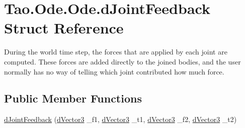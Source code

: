 \hypertarget{struct_tao_1_1_ode_1_1_ode_1_1d_joint_feedback}{
\section{Tao.Ode.Ode.dJointFeedback Struct Reference}
\label{struct_tao_1_1_ode_1_1_ode_1_1d_joint_feedback}
}


During the world time step, the forces that are applied by each joint are computed. These forces are added directly to the joined bodies, and the user normally has no way of telling which joint contributed how much force.  


\subsection*{Public Member Functions}
\begin{DoxyCompactItemize}
\item 
\hyperlink{struct_tao_1_1_ode_1_1_ode_1_1d_joint_feedback_a9d0c7a7b0c2f1ce2bf02754db28aeae0}{dJointFeedback} (\hyperlink{struct_tao_1_1_ode_1_1_ode_1_1d_vector3}{dVector3} \_\-f1, \hyperlink{struct_tao_1_1_ode_1_1_ode_1_1d_vector3}{dVector3} \_\-t1, \hyperlink{struct_tao_1_1_ode_1_1_ode_1_1d_vector3}{dVector3} \_\-f2, \hyperlink{struct_tao_1_1_ode_1_1_ode_1_1d_vector3}{dVector3} \_\-t2)
\end{DoxyCompactItemize}
